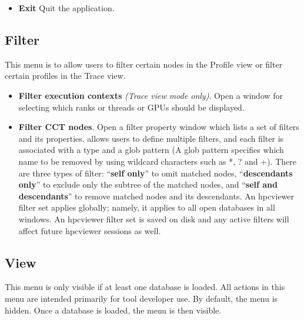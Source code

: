 \documentclass[english]{article}
\begin{document}
\begin{itemize}
\item \textbf{Exit}
  Quit the  application.

\end{itemize}


\subsection{Filter}
This menu is to allow users to filter certain nodes in the Profile view or filter certain profiles in the Trace view.
\begin{itemize}

 \item \textbf{Filter execution contexts} \emph{(Trace view mode only)}.
  Open a window for selecting which ranks or threads or GPUs should be displayed.

 \item \textbf{Filter CCT nodes}.
  Open a filter property window which lists a set of filters and its properties.
 allows  users to define multiple filters, and each filter is associated with a type and a glob pattern (A glob pattern specifies which name to be removed by using wildcard characters such as *, ? and +).
There are three types of filter: ``\textbf{self only}'' to omit matched nodes,
``\textbf{descendants only}'' to exclude only the subtree of the matched nodes, and ``\textbf{self and descendants}'' to
remove matched nodes and its descendants.
An hpcviewer filter set applies globally; namely, it applies to all open databases in all windows. An hpcviewer filter set is saved on disk and any active filters will affect future hpcviewer sessions as well.


\end{itemize}


\subsection{View}
This menu is only visible if at least one database is loaded.
All actions in this menu are intended primarily for tool developer use.
By default, the menu is hidden. Once a database is loaded, the menu is then visible.
\end{document}
